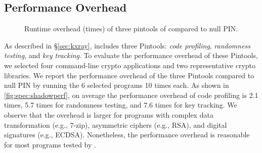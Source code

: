 

\subsection{Performance Overhead}\label{sec:eval:efficiency}

\begin{figure*}
\centering
{}
\vspace{-0.1in}
\caption{Runtime overhead (times) of three pintools of \sysname compared to null PIN.}
\label{fig:spec:shadowperf}
\end{figure*}

As described in \S\ref{sec:kxray}, \sysname includes three {Pintools}: \emph{code profiling},  \emph{randomness testing}, and \emph{key tracking}. To evaluate the performance overhead of these Pintools, we selected four command-line crypto applications and two representative crypto libraries. 
We report the performance overhead of the three Pintools compared to null PIN by running the 6 selected programs 10 times each. As shown in \autoref{fig:spec:shadowperf},
on average the performance overhead of code profiling is 2.1 times, 5.7 times for randomness testing, and 7.6 times for key tracking. We observe that the overhead is larger for programs with complex data transformation (e.g., 7-zip), asymmetric ciphers (e.g., RSA), and digital signatures (e.g., ECDSA). Nonetheless, the performance overhead is reasonable for most programs tested by \sysname. %

